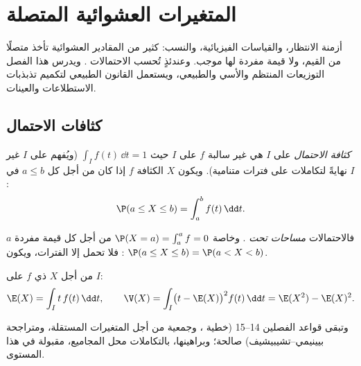 \chapter{المتغيرات العشوائية المتصلة}\label{ch:g12:contdist}

أزمنة الانتظار، والقياسات الفيزيائية، والنسب: كثير من المقادير العشوائية
تأخذ متصلًا من القيم، ولا قيمة مفردة لها  موجب.
وعندئذٍ تُحسب الاحتمالات  \emph{}. ويدرس هذا
الفصل التوزيعات المنتظم والأسي والطبيعي، ويستعمل
القانون الطبيعي لتكميم تذبذبات الاستطلاعات والعينات.

\section{كثافات الاحتمال}

\begin{definition}\label{def:g12:contdist:density}
\emph{كثافة الاحتمال} على  $I$ هي
 غير سالبة $f$ على $I$ حيث $\int_I f(t)\,\dd t = 1$
(ويُفهم  على $I$ غير  نهايةً لتكاملات
على فترات  متنامية). ويكون  $X$
الكثافة $f$ إذا كان من أجل كل $a \leq b$ في $I$:
\[
\P(a \leq X \leq b) = \int_a^b f(t)\,\dd t .
\]
\end{definition}

فالاحتمالات \emph{مساحات تحت  }. وخاصة
$\P(X = a) = \int_a^a f = 0$ من أجل كل قيمة مفردة $a$: فلا تحمل  إلا
الفترات، ويكون $\P(a \leq X \leq b) = \P(a < X < b)$.

\begin{definition}\label{def:g12:contdist:exp}
من أجل $X$ ذي  $f$ على $I$:
\[
\E(X) = \int_I t\,f(t)\,\dd t, \qquad
\V(X) = \int_I \bigl(t - \E(X)\bigr)^2 f(t)\,\dd t
= \E(X^2) - \E(X)^2 .
\]
\end{definition}

وتبقى قواعد الفصلين 14--15 (خطية ، وجمعية
 من أجل المتغيرات المستقلة، ومتراجحة بيينيمي--تشيبيشيف) صالحة؛
وبراهينها، بالتكاملات محل المجاميع، مقبولة في هذا المستوى.


